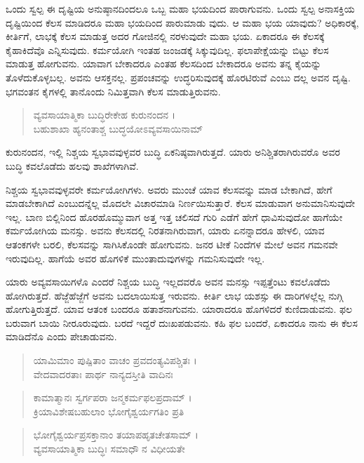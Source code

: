 ಒಂದು ಸ್ವಲ್ಪ ಈ ದೃಷ್ಟಿಯ ಅನುಷ್ಠಾನದಿಂದಲೂ ಒಬ್ಬ ಮಹಾ ಭಯದಿಂದ ಪಾರಾಗುವನು. ಒಂದು ಸ್ವಲ್ಪ ಅನಾಸಕ್ತಿಯ ದೃಷ್ಟಿಯಿಂದ ಕೆಲಸ ಮಾಡಿದರೂ ಮಹಾ ಭಯದಿಂದ ಪಾರುಮಾಡು ವುದು. ಆ ಮಹಾ ಭಯ ಯಾವುದು? ಅಧಿಕಾರಕ್ಕೆ, ಕೀರ್ತಿಗೆ, ಲಾಭಕ್ಕೆ ಕೆಲಸ ಮಾಡುತ್ತ ಅದರ ಗೋಜಿನಲ್ಲಿ ನರಳುವುದೇ ಮಹಾ ಭಯ. ಏಕಾದರೂ ಈ ಕೆಲಸಕ್ಕೆ ಕೈಹಾಕಿದೆವೊ ಎನ್ನಿಸುವುದು. ಕರ್ಮಯೋಗಿ ಇಂತಹ ಜಂಜಡಕ್ಕೆ ಸಿಕ್ಕುವುದಿಲ್ಲ. ಫಲಾಪೇಕ್ಷೆಯನ್ನು ಬಿಟ್ಟು ಕೆಲಸ ಮಾಡುತ್ತ ಹೋಗುವನು. ಯಾವಾಗ ಬೇಕಾದರೂ ಎಂತಹ ಕೆಲಸದಿಂದ ಬೇಕಾದರೂ ಅವನು ತನ್ನ ಕೈಯನ್ನು ತೊಳೆದುಕೊಳ್ಳಬಲ್ಲ. ಅವನು ಆಸಕ್ತನಲ್ಲ. ಪ್ರಪಂಚವನ್ನು ಉದ್ಧರಿಸುವುದಕ್ಕೆ ಹೊರಟಿರುವೆ ಎಂಬು ದಲ್ಲ ಅವನ ದೃಷ್ಟಿ. ಭಗವಂತನ ಕೈಗಳಲ್ಲಿ ತಾನೊಂದು ನಿಮಿತ್ತವಾಗಿ ಕೆಲಸ ಮಾಡುತ್ತಿರುವನು.

\begin{verse}
ವ್ಯವಸಾಯಾತ್ಮಿಕಾ ಬುದ್ಧಿರೇಕೇಹ ಕುರುನಂದನ ।\\ಬಹುಶಾಖಾ ಹ್ಯನಂತಾಶ್ಚ ಬುದ್ಧಯೋಽವ್ಯವಸಾಯಿನಾಮ್ 
\end{verse}

{\small ಕುರುನಂದನ, ಇಲ್ಲಿ ನಿಶ್ಚಯ ಸ್ವಭಾವವುಳ್ಳವರ ಬುದ್ಧಿ ಏಕನಿಷ್ಠವಾಗಿರುತ್ತದೆ. ಯಾರು ಅನಿಶ್ಚಿತರಾಗಿರುವರೊ ಅವರ ಬುದ್ಧಿ ಕವಲೊಡೆದು ಹಲವು ಶಾಖೆಗಳಾಗಿವೆ.}

ನಿಶ್ಚಯ ಸ್ವಭಾವವುಳ್ಳವರೇ ಕರ್ಮಯೋಗಿಗಳು. ಅವರು ಮುಂಚೆ ಯಾವ ಕೆಲಸವನ್ನು ಮಾಡ ಬೇಕಾಗಿದೆ, ಹೇಗೆ ಮಾಡಬೇಕಾಗಿದೆ ಎಂಬುದನ್ನೆಲ್ಲ ಮೊದಲೇ ವಿಚಾರಮಾಡಿ ನಿರ್ಣಯಿಸುತ್ತಾರೆ. ಕೆಲಸ ಮಾಡುವಾಗ ಅನುಮಾನಿಸುವುದೇ ಇಲ್ಲ. ಬಾಣ ಬಿಲ್ಲಿನಿಂದ ಹೊರಹೊಮ್ಮುವಾಗ ಅತ್ತ ಇತ್ತ ಚಲಿಸದೆ ಗುರಿ ಎಡೆಗೆ ಹೇಗೆ ಧಾವಿಸುವುದೋ ಹಾಗೆಯೇ ಕರ್ಮಯೋಗಿಯ ಮನಸ್ಸು. ಅವನು ಕೆಲಸದಲ್ಲಿ ನಿರತನಾಗಿರುವಾಗ, ಯಾರು ಏನನ್ನಾದರೂ ಹೇಳಲಿ, ಯಾವ ಆತಂಕಗಳೇ ಬರಲಿ, ಕೆಲಸವನ್ನು ಸಾಗಿಸಿಕೊಂಡೇ ಹೋಗುವನು. ಜನರ ಟೀಕೆ ನಿಂದೆಗಳ ಮೇಲೆ ಅವನ ಗಮನವೇ ಇರುವುದಿಲ್ಲ. ಹಾಗೆಯೆ ಅವರ ಹೊಗಳಿಕೆ ಮುಂತಾದುವುಗಳನ್ನು ಗಮನಿಸುವುದೇ ಇಲ್ಲ.

ಯಾರು ಅವ್ಯವಸಾಯಿಗಳೊ ಎಂದರೆ ನಿಶ್ಚಯ ಬುದ್ಧಿ ಇಲ್ಲದವರೊ ಅವನ ಮನಸ್ಸು ಇಪ್ಪತ್ತೆಂಟು ಕವಲೊಡೆದು ಹೋಗಿರುತ್ತದೆ. ಹೆಜ್ಜೆಹೆಜ್ಜೆಗೆ ಅವನು ಬದಲಾಯಿಸುತ್ತ ಇರುವನು. ಕೀರ್ತಿ ಲಾಭ ಯಶಸ್ಸು ಈ ದಾರಿಗಳಲ್ಲೆಲ್ಲ ನುಗ್ಗಿ ಹೋಗುತ್ತಿರುತ್ತದೆ. ಯಾವ ಆತಂಕ ಬಂದರೂ ಹತಾಶನಾಗುವನು. ಯಾರಾದರೂ ಹೊಗಳಿದರೆ ಕುಣಿದಾಡುವನು. ಫಲ ಬರುವಾಗ ಬಾಯಿ ನೀರೂರುವುದು. ಬರದೆ ಇದ್ದರೆ ದುಃಖಪಡುವನು. ಕಹಿ ಫಲ ಬಂದರೆ, ಏಕಾದರೂ ನಾನು ಈ ಕೆಲಸ ಮಾಡಿದೆನೊ ಎಂದು ಪೇಚಾಡುವನು.

\begin{verse}
ಯಾಮಿಮಾಂ ಪುಷ್ಪಿತಾಂ ವಾಚಂ ಪ್ರವದಂತ್ಯವಿಪಶ್ಚಿತಃ ।\\ವೇದವಾದರತಾಃ ಪಾರ್ಥ ನಾನ್ಯದಸ್ತೀತಿ ವಾದಿನಃ 
\end{verse}

\begin{verse}
ಕಾಮಾತ್ಮಾನಃ ಸ್ವರ್ಗಪರಾ ಜನ್ಮಕರ್ಮಫಲಪ್ರದಾಮ್ ।\\ಕ್ರಿಯಾವಿಶೇಷಬಹುಲಾಂ ಭೋಗೈಶ್ವರ್ಯಗತಿಂ ಪ್ರತಿ 
\end{verse}

\begin{verse}
ಭೋಗೈಶ್ವರ್ಯಪ್ರಸಕ್ತಾನಾಂ ತಯಾಪಹೃತಚೇತಸಾಮ್ ।\\ವ್ಯವಸಾಯಾತ್ಮಿಕಾ ಬುದ್ಧಿಃ ಸಮಾಧೌ ನ ವಿಧೀಯತೇ 
\end{verse}

